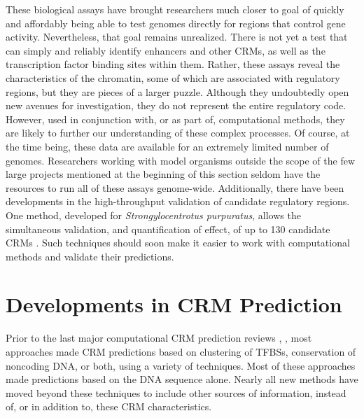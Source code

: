 \documentclass{frontiersENG} %
\begin{document}
These biological assays have brought researchers much closer to goal
of quickly and affordably being able to test genomes directly for
regions that control gene activity. Nevertheless, that goal remains
unrealized. There is not yet a test that can simply and reliably
identify enhancers and other CRMs, as well as the transcription factor
binding sites within them. Rather, these assays reveal the
characteristics of the chromatin, some of which are associated with
regulatory regions, but they are pieces of a larger puzzle. Although
they undoubtedly open new avenues for investigation, they do not
represent the entire regulatory code. However, used in conjunction
with, or as part of, computational methods, they are likely to further
our understanding of these complex processes. Of course, at the time
being, these data are available for an extremely limited number of
genomes. Researchers working with model organisms outside the scope of
the few large projects mentioned at the beginning of this section
seldom have the resources to run all of these assays
genome-wide. Additionally, there have been developments in the
high-throughput validation of candidate regulatory regions. One
method, developed for \textit{Strongylocentrotus purpuratus}, allows
the simultaneous validation, and quantification of effect, of up to
130 candidate CRMs \cite{Nam2012}. Such techniques should soon make it
easier to work with computational methods and validate their
predictions.

\section{Developments in CRM Prediction}
\label{section:developments}
Prior to the last major computational CRM prediction reviews
\cite{Su2010}, \cite{Loo2009}, most approaches made CRM predictions
based on clustering of TFBSs, conservation of noncoding DNA, or both,
using a variety of techniques. Most of these approaches made
predictions based on the DNA sequence alone. Nearly all new methods
have moved beyond these techniques to include other sources of
information, instead of, or in addition to, these CRM characteristics.
\end{document}
